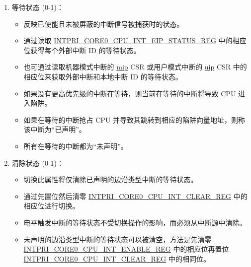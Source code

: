 \documentclass[main\_\_CN.tex]{subfiles}
\begin{document}
\begin{enumerate}
\begin{itemize}
        \item 通过写入外部中断 ID  的 \hyperref[regdesc:INTPRICORE0CPUINTPRINREG]{INTPRI\_CORE0\_CPU\_INT\_PRI\_\_REG} 进行配置。
        \item 优先级小于 \hyperref[regdesc:INTPRICORE0CPUINTTHRESHREG]{INTPRI\_CORE0\_CPU\_INT\_THRESH\_REG} 指定阈值的外部中断将被屏蔽。
        \item 优先级最低为 0，最高为 15。
        \item 具有相同优先级的中断通过其 ID 静态确定优先级，ID 越小，优先级越高。
        \item 本地 CLINT 中断具有静态的优先级，因此保留了相应的优先级寄存器。
        \item 本地 CLINT 中断在两种模式下均不会被优先级阈值屏蔽。
    \end{itemize}
    \item 等待状态 (0-1)：
    \begin{itemize}
        \item 反映已使能且未被屏蔽的中断信号被捕获时的状态。
        \item 通过读取 \hyperref[regdesc:INTPRICORE0CPUINTEIPSTATUSREG]{INTPRI\_CORE0\_CPU\_INT\_EIP\_STATUS\_REG} 中的相应位获得每个外部中断 ID 的等待状态。
        \item 也可通过读取机器模式中断的 \hyperref[regdesc:MIP]{mip} CSR 或用户模式中断的 \hyperref[regdesc:UIP]{uip} CSR 中的相应位来获取外部中断和本地中断 ID 的等待状态。
        \item 如果没有更高优先级的中断在等待，则当前在等待的中断将导致 CPU 进入陷阱。
        \item 如果在等待的中断抢占 CPU 并导致其跳转到相应的陷阱向量地址，则称该中断为“已声明”。
        \item 所有在等待的中断都为“未声明”。
    \end{itemize}
    \item 清除状态 (0-1)：
    \begin{itemize}
        \item 切换此属性将仅清除已声明的边沿类型中断的等待状态。
        \item 通过先置位然后清零 \hyperref[regdesc:INTPRICORE0CPUINTCLEARREG]{INTPRI\_CORE0\_CPU\_INT\_CLEAR\_REG} 中的相应位进行切换。
        \item 电平触发中断的等待状态不受切换操作的影响，而必须从中断源中清除。
        \item 未声明的边沿类型中断的等待状态可以被清空，方法是先清零 \hyperref[regdesc:INTPRICORE0CPUINTENABLEREG]{INTPRI\_CORE0\_CPU\_INT\_ENABLE\_REG} 中的相应位再置位 \hyperref[regdesc:INTPRICORE0CPUINTCLEARREG]{INTPRI\_CORE0\_CPU\_INT\_CLEAR\_REG} 中的相同位。
    \end{itemize}
\end{enumerate}
\end{document}
